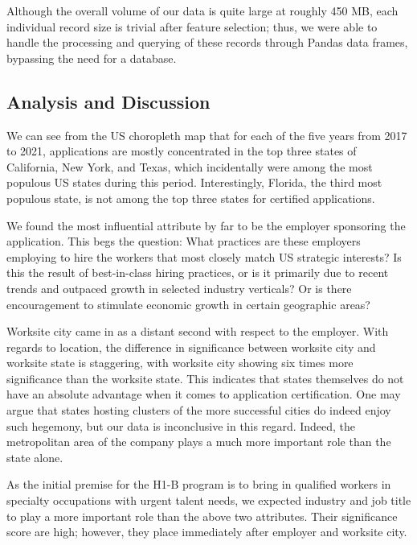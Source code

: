 \documentclass[sigconf]{acmart}
\begin{document}
Although the overall volume of our data is quite large at roughly 450 MB, 
each individual record size is trivial after feature selection; thus, we 
were able to handle the processing and querying of these records through Pandas data frames, 
bypassing the need for a database. 


\subsection{Analysis and Discussion}



We can see from the US choropleth map that for each of the five years from 2017 to 2021, 
applications are mostly 
concentrated in the top three states of California, 
New York, and Texas, which incidentally were among the most populous US states during this period. 
Interestingly, Florida, the third most populous state, is not among the top three states for 
certified applications. 


We found the most influential attribute by far to be the employer sponsoring 
the application. This begs the question: What practices are these employers employing 
to hire the workers that most closely match US strategic interests? 
Is this the result of best-in-class hiring practices, or is it primarily due to 
recent trends and outpaced growth in selected industry verticals? 
Or is there encouragement to stimulate economic growth in certain geographic areas? 


Worksite city came in as a distant second with respect to the employer. 
With regards to location, the difference in significance between worksite city 
and worksite state is staggering, with worksite city showing six times more significance 
than the worksite state. This indicates that states themselves do not have an absolute advantage 
when it comes to application certification. One may argue that states hosting clusters of 
the more successful cities do indeed enjoy such hegemony, but our data is inconclusive in this regard.
Indeed, the metropolitan area of the company plays a much more important role than the state alone. 


As the initial premise for the H1-B program is to bring in qualified workers in specialty 
occupations with urgent 
talent needs, we expected industry and job title to play a more important role than 
the above two attributes. Their significance 
score are high; however, they place immediately after employer and worksite city. 
\end{document}
